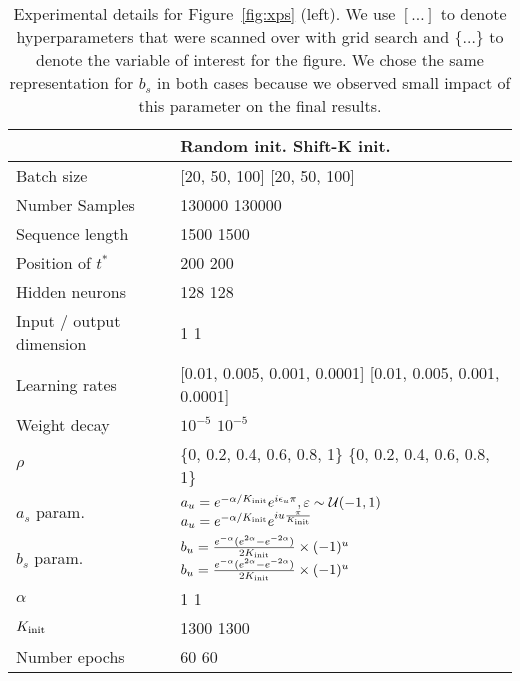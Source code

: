 \begin{table}[ht]
    \centering
    \begin{tabular}{@{}ll@{}}
        \toprule
        & \textbf{Random init.} \hspace{4,2cm} \textbf{Shift-K init.} \\ \midrule
        Batch size & [20, 50, 100] \hspace{4,4cm} [20, 50, 100] \\
        Number Samples & 130000 \hspace{5,2cm} 130000\\
        Sequence length & 1500 \hspace{5,6cm} 1500 \\
        Position of $t^*$ & 200 \hspace{5,8cm} 200 \\
        Hidden neurons & 128 \hspace{5,8cm} 128 \\
        Input / output dimension & 1 \hspace{6,2cm} 1 \\
        Learning rates & [0.01, 0.005, 0.001, 0.0001] \hspace{2,2cm}[0.01, 0.005, 0.001, 0.0001] \\
        Weight decay & $10^{-5}$ \hspace{5,7cm}$10^{-5}$ \\ 
        $\rho$ & \{0, 0.2, 0.4, 0.6, 0.8, 1\} \hspace{2,7cm} \{0, 0.2, 0.4, 0.6, 0.8, 1\} \\ \midrule
        $a_s$ param. & $a_u = e^{-\alpha/K_{\textnormal{init}}}e^{i\epsilon_u\pi}, \varepsilon \sim \mathcal{U}(-1,1)$ \hspace{1cm} $a_u = e^{-\alpha/K_{\textnormal{init}}}e^{iu\frac{\pi}{K_{\textnormal{init}}}}$\\
         $b_s$ param. & $b_u = \frac{e^{-\alpha}(e^{2\alpha}-e^{-2\alpha})}{2K_{\textnormal{init}}}\times(-1)^u$ \hspace{1,8cm} $b_u = \frac{e^{-\alpha}(e^{2\alpha}-e^{-2\alpha})}{2K_{\textnormal{init}}}\times(-1)^u$  \\
        $\alpha$ & 1 \hspace{6,2cm} 1 \\
       $K_{\textnormal{init}}$ & 1300 \hspace{5,6cm} 1300 \\ \midrule
        Number epochs & 60 \hspace{6cm} 60 \\
        \bottomrule
    \end{tabular}
    \caption{{Experimental details for Figure~\ref{fig:xps} (left)}. We use $[\dots]$ to denote hyperparameters that were scanned over with grid search and $\{\dots\}$ to denote the variable of interest for the figure. We chose the same representation for $b_s$ in both cases because we observed small impact of this parameter on the final results.}
    \label{tab:xp-compare_init}
\end{table}

